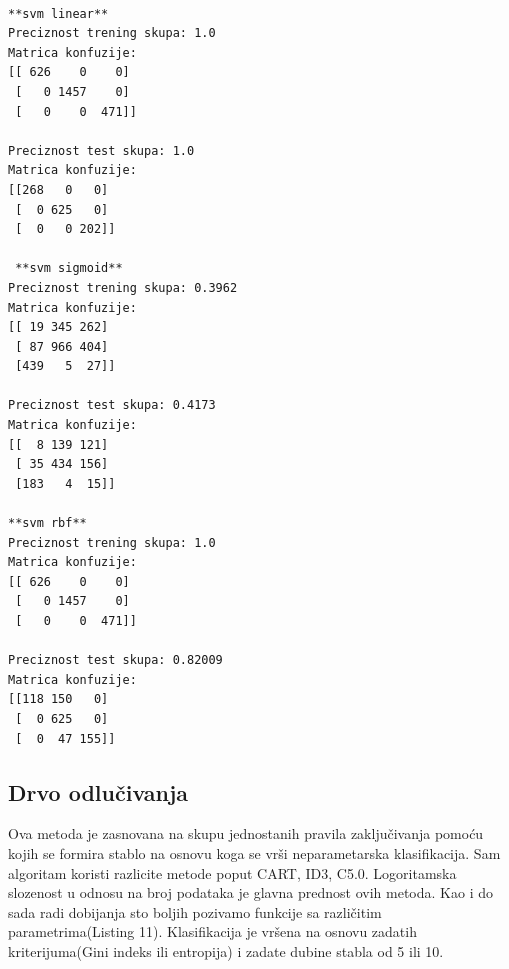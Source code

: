 \documentclass[14pt]{extarticle}
\begin{document}
\begin{lstlisting}[caption={Rezultati SVM},frame=single, label=simple]

**svm linear**
Preciznost trening skupa: 1.0
Matrica konfuzije:
[[ 626    0    0]
 [   0 1457    0]
 [   0    0  471]]
 
Preciznost test skupa: 1.0
Matrica konfuzije:
[[268   0   0]
 [  0 625   0]
 [  0   0 202]]

 **svm sigmoid** 
Preciznost trening skupa: 0.3962
Matrica konfuzije:
[[ 19 345 262]
 [ 87 966 404]
 [439   5  27]]
 
Preciznost test skupa: 0.4173
Matrica konfuzije:
[[  8 139 121]
 [ 35 434 156]
 [183   4  15]]
 
**svm rbf**
Preciznost trening skupa: 1.0
Matrica konfuzije:
[[ 626    0    0]
 [   0 1457    0]
 [   0    0  471]]
 
Preciznost test skupa: 0.82009
Matrica konfuzije:
[[118 150   0]
 [  0 625   0]
 [  0  47 155]]

\end{lstlisting}
\subsection{Drvo odlučivanja}
\label{subsec:podnaslovM}
Ova metoda je zasnovana na skupu jednostanih pravila zaključivanja pomoću kojih se formira stablo na osnovu koga se vrši neparametarska klasifikacija. Sam algoritam koristi razlicite metode poput CART, ID3, C5.0.  Logoritamska slozenost u odnosu na broj podataka je glavna prednost ovih metoda. Kao i do sada radi dobijanja sto boljih pozivamo funkcije sa različitim parametrima(Listing 11). Klasifikacija je vršena na osnovu zadatih kriterijuma(Gini indeks ili entropija) i zadate dubine stabla od 5 ili 10.
\end{document}
